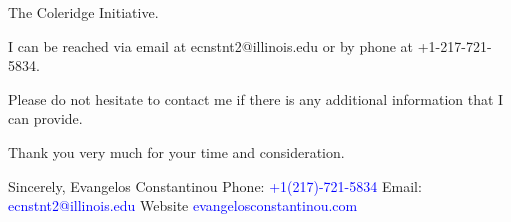 \documentclass[12pt]{letter}
\begin{document}
\begin{letter}{The Coleridge Initiative.}


I can be reached via email at ecnstnt2@illinois.edu or by phone at +1-217-721-5834.

Please do not hesitate to contact me if there is any additional information that I can provide.

Thank you very much for your time and consideration.


\noindent Sincerely,
\newline\noindent Evangelos Constantinou
\vspace{4mm}
\newline\noindent Phone: \textcolor{blue}{+1(217)-721-5834}
\newline\noindent Email: \textcolor{blue}{ecnstnt2@illinois.edu}
\newline\noindent Website \textcolor{blue}{evangelosconstantinou.com}
\end{letter}
\end{document}
